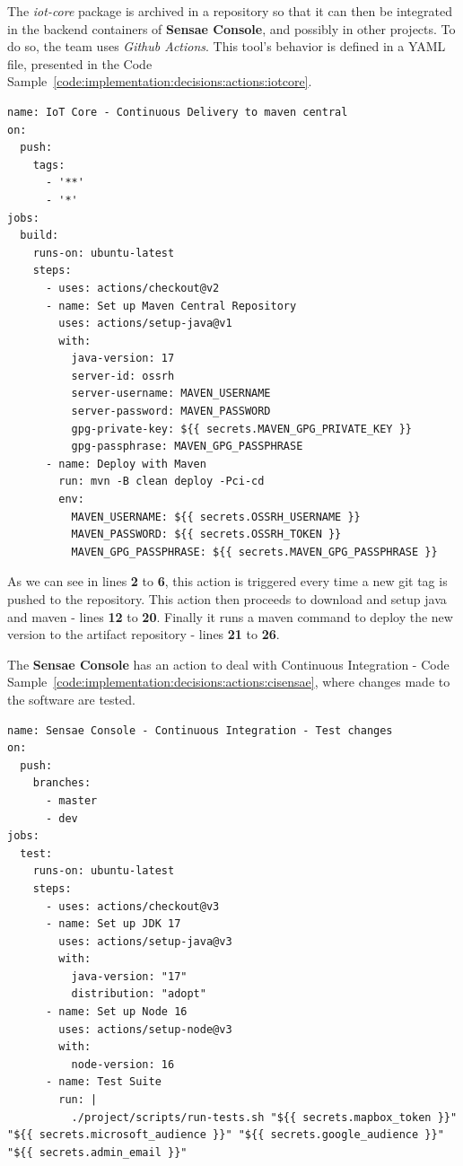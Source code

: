 The \textit{iot-core} package is archived in a repository so that it can then be integrated in the backend containers of \textbf{Sensae Console}, and possibly in other projects. To do so, the team uses \textit{Github Actions}. This tool's behavior is defined in a YAML file, presented in the Code Sample~\ref{code:implementation:decisions:actions:iotcore}.

\begin{lstlisting}[style=yaml, caption=Configuration File for \textit{iot-core} Continuous Delivery, label={code:implementation:decisions:actions:iotcore}]
name: IoT Core - Continuous Delivery to maven central
on:
  push:
    tags:
      - '**'
      - '*'
jobs:
  build:
    runs-on: ubuntu-latest
    steps:
      - uses: actions/checkout@v2
      - name: Set up Maven Central Repository
        uses: actions/setup-java@v1
        with:
          java-version: 17
          server-id: ossrh
          server-username: MAVEN_USERNAME
          server-password: MAVEN_PASSWORD
          gpg-private-key: ${{ secrets.MAVEN_GPG_PRIVATE_KEY }}
          gpg-passphrase: MAVEN_GPG_PASSPHRASE
      - name: Deploy with Maven
        run: mvn -B clean deploy -Pci-cd
        env:
          MAVEN_USERNAME: ${{ secrets.OSSRH_USERNAME }}
          MAVEN_PASSWORD: ${{ secrets.OSSRH_TOKEN }}
          MAVEN_GPG_PASSPHRASE: ${{ secrets.MAVEN_GPG_PASSPHRASE }}
\end{lstlisting}

As we can see in lines \textbf{2} to \textbf{6}, this action is triggered every time a new git tag is pushed to the repository.
This action then proceeds to download and setup java and maven - lines \textbf{12} to \textbf{20}. Finally it runs a maven command to deploy the new version to the artifact repository - lines \textbf{21} to \textbf{26}.

The \textbf{Sensae Console} has an action to deal with Continuous Integration - Code Sample~\ref{code:implementation:decisions:actions:cisensae}, where changes made to the software are tested.

\begin{lstlisting}[style=yaml, caption=Configuration File for \textbf{Sensae Console} Continuous Integration, label={code:implementation:decisions:actions:cisensae}]
name: Sensae Console - Continuous Integration - Test changes
on:
  push:
    branches:
      - master
      - dev
jobs:
  test:
    runs-on: ubuntu-latest
    steps:
      - uses: actions/checkout@v3
      - name: Set up JDK 17
        uses: actions/setup-java@v3
        with:
          java-version: "17"
          distribution: "adopt"
      - name: Set up Node 16
        uses: actions/setup-node@v3
        with:
          node-version: 16
      - name: Test Suite
        run: |
          ./project/scripts/run-tests.sh "${{ secrets.mapbox_token }}" "${{ secrets.microsoft_audience }}" "${{ secrets.google_audience }}" "${{ secrets.admin_email }}"

\end{lstlisting}

